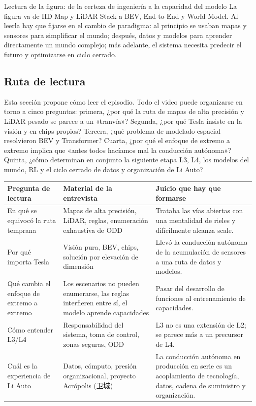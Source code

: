 \documentclass[a4paper]{article}
\begin{document}
\begin{knowledgebox}{Lectura de la figura: de la certeza de ingeniería a la capacidad del modelo}
La figura va de HD Map y LiDAR Stack a BEV, End-to-End y World Model. Al leerla hay que fijarse en el cambio de paradigma: al principio se usaban mapas y sensores para simplificar el mundo; después, datos y modelos para aprender directamente un mundo complejo; más adelante, el sistema necesita predecir el futuro y optimizarse en ciclo cerrado.
\end{knowledgebox}

\subsection{Ruta de lectura}

Esta sección propone cómo leer el episodio. Todo el video puede organizarse en torno a cinco preguntas: primera, ¿por qué la ruta de mapas de alta precisión y LiDAR pesado se parece a un «tranvía»? Segunda, ¿por qué Tesla insiste en la visión y en chips propios? Tercera, ¿qué problema de modelado espacial resolvieron BEV y Transformer? Cuarta, ¿por qué el enfoque de extremo a extremo implica que «antes todos hacíamos mal la conducción autónoma»? Quinta, ¿cómo determinan en conjunto la siguiente etapa L3, L4, los modelos del mundo, RL y el ciclo cerrado de datos y organización de Li Auto?

\noindent\begin{tabularx}{\textwidth}{p{}p{}X}
\toprule
Pregunta de lectura & Material de la entrevista & Juicio que hay que formarse \\
\midrule
En qué se equivocó la ruta temprana & Mapas de alta precisión, LiDAR, reglas, enumeración exhaustiva de ODD & Trataba las vías abiertas con una mentalidad de rieles y difícilmente alcanza scale. \\
Por qué importa Tesla & Visión pura, BEV, chips, solución por elevación de dimensión & Llevó la conducción autónoma de la acumulación de sensores a una ruta de datos y modelos. \\
Qué cambia el enfoque de extremo a extremo & Los escenarios no pueden enumerarse, las reglas interfieren entre sí, el modelo aprende capacidades & Pasar del desarrollo de funciones al entrenamiento de capacidades. \\
Cómo entender L3/L4 & Responsabilidad del sistema, toma de control, zonas seguras, ODD & L3 no es una extensión de L2; se parece más a un precursor de L4. \\
Cuál es la experiencia de Li Auto & Datos, cómputo, presión organizacional, proyecto Acrópolis (卫城) & La conducción autónoma en producción en serie es un acoplamiento de tecnología, datos, cadena de suministro y organización. \\
\bottomrule
\end{tabularx}
\end{document}
